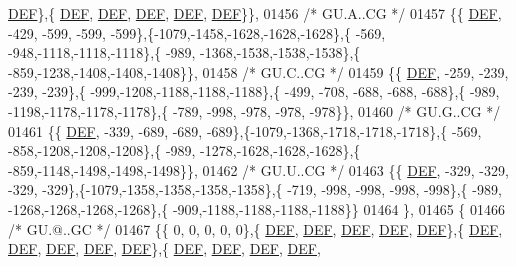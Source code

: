 \begin{DoxyCode}
      \mbox{\hyperlink{1_88_84__epars_8h_a397419fc12b37ed479c8abb9d444d843}{DEF}}\},\{  \mbox{\hyperlink{1_88_84__epars_8h_a397419fc12b37ed479c8abb9d444d843}{DEF}},  \mbox{\hyperlink{1_88_84__epars_8h_a397419fc12b37ed479c8abb9d444d843}{DEF}},  \mbox{\hyperlink{1_88_84__epars_8h_a397419fc12b37ed479c8abb9d444d843}{DEF}},  \mbox{\hyperlink{1_88_84__epars_8h_a397419fc12b37ed479c8abb9d444d843}{DEF}},  \mbox{\hyperlink{1_88_84__epars_8h_a397419fc12b37ed479c8abb9d444d843}{DEF}}\}\},
01456 \textcolor{comment}{/* GU.A..CG */}
01457 \{\{  \mbox{\hyperlink{1_88_84__epars_8h_a397419fc12b37ed479c8abb9d444d843}{DEF}}, -429, -599, -599, -599\},\{-1079,-1458,-1628,-1628,-1628\},\{ -569, -948,-1118,-1118,-1118\},\{ -989,
      -1368,-1538,-1538,-1538\},\{ -859,-1238,-1408,-1408,-1408\}\},
01458 \textcolor{comment}{/* GU.C..CG */}
01459 \{\{  \mbox{\hyperlink{1_88_84__epars_8h_a397419fc12b37ed479c8abb9d444d843}{DEF}}, -259, -239, -239, -239\},\{ -999,-1208,-1188,-1188,-1188\},\{ -499, -708, -688, -688, -688\},\{ -989,
      -1198,-1178,-1178,-1178\},\{ -789, -998, -978, -978, -978\}\},
01460 \textcolor{comment}{/* GU.G..CG */}
01461 \{\{  \mbox{\hyperlink{1_88_84__epars_8h_a397419fc12b37ed479c8abb9d444d843}{DEF}}, -339, -689, -689, -689\},\{-1079,-1368,-1718,-1718,-1718\},\{ -569, -858,-1208,-1208,-1208\},\{ -989,
      -1278,-1628,-1628,-1628\},\{ -859,-1148,-1498,-1498,-1498\}\},
01462 \textcolor{comment}{/* GU.U..CG */}
01463 \{\{  \mbox{\hyperlink{1_88_84__epars_8h_a397419fc12b37ed479c8abb9d444d843}{DEF}}, -329, -329, -329, -329\},\{-1079,-1358,-1358,-1358,-1358\},\{ -719, -998, -998, -998, -998\},\{ -989,
      -1268,-1268,-1268,-1268\},\{ -909,-1188,-1188,-1188,-1188\}\}
01464 \},
01465 \{
01466 \textcolor{comment}{/* GU.@..GC */}
01467 \{\{    0,    0,    0,    0,    0\},\{  \mbox{\hyperlink{1_88_84__epars_8h_a397419fc12b37ed479c8abb9d444d843}{DEF}},  \mbox{\hyperlink{1_88_84__epars_8h_a397419fc12b37ed479c8abb9d444d843}{DEF}},  \mbox{\hyperlink{1_88_84__epars_8h_a397419fc12b37ed479c8abb9d444d843}{DEF}},  \mbox{\hyperlink{1_88_84__epars_8h_a397419fc12b37ed479c8abb9d444d843}{DEF}},  \mbox{\hyperlink{1_88_84__epars_8h_a397419fc12b37ed479c8abb9d444d843}{DEF}}\},\{  
      \mbox{\hyperlink{1_88_84__epars_8h_a397419fc12b37ed479c8abb9d444d843}{DEF}},  \mbox{\hyperlink{1_88_84__epars_8h_a397419fc12b37ed479c8abb9d444d843}{DEF}},  \mbox{\hyperlink{1_88_84__epars_8h_a397419fc12b37ed479c8abb9d444d843}{DEF}},  \mbox{\hyperlink{1_88_84__epars_8h_a397419fc12b37ed479c8abb9d444d843}{DEF}},  \mbox{\hyperlink{1_88_84__epars_8h_a397419fc12b37ed479c8abb9d444d843}{DEF}}\},\{  \mbox{\hyperlink{1_88_84__epars_8h_a397419fc12b37ed479c8abb9d444d843}{DEF}},  \mbox{\hyperlink{1_88_84__epars_8h_a397419fc12b37ed479c8abb9d444d843}{DEF}},  \mbox{\hyperlink{1_88_84__epars_8h_a397419fc12b37ed479c8abb9d444d843}{DEF}},  \mbox{\hyperlink{1_88_84__epars_8h_a397419fc12b37ed479c8abb9d444d843}{DEF}},  

\end{DoxyCode}
